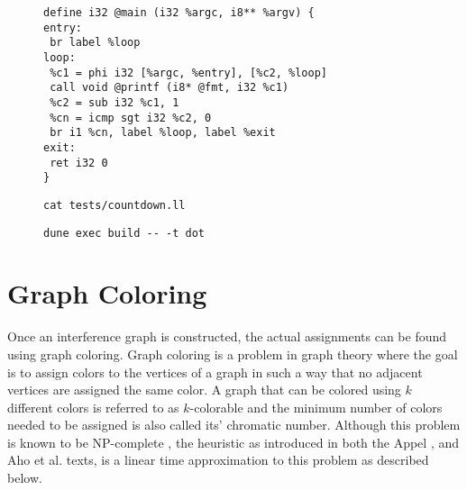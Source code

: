 \documentclass{article}
\begin{document}
\begin{figure}[H]
     \centering
     \begin{minipage}[b]{0.57\textwidth}
     \begin{verbatim}
define i32 @main (i32 %argc, i8** %argv) {
entry:
 br label %loop
loop:
 %c1 = phi i32 [%argc, %entry], [%c2, %loop]
 call void @printf (i8* @fmt, i32 %c1)
 %c2 = sub i32 %c1, 1
 %cn = icmp sgt i32 %c2, 0
 br i1 %cn, label %loop, label %exit
exit:
 ret i32 0
}
     \end{verbatim}
     \caption{\texttt{cat tests/countdown.ll}}\label{fig:countdown.ll}
   \end{minipage}
   \begin{minipage}[b]{0.42\textwidth}
     \centering
     
     \caption{\texttt{dune exec build -{}- -t dot}}\label{fig:countdown.dot}
   \end{minipage}
\end{figure}









\section{Graph Coloring}
Once an interference graph is constructed, the actual assignments can be found using graph coloring.
Graph coloring is a problem in graph theory where the goal is to assign colors to the vertices of a graph in such a way that no adjacent vertices are assigned the same color.
A graph that can be colored using \(k\) different colors is referred to as \(k\)-colorable and the minimum number of colors needed to be assigned is also called its' chromatic number.
Although this problem is known to be NP-complete  \cites[229]{tiger}[510]{dragon}, the heuristic as introduced in
both the Appel \cite[229]{tiger}, and Aho et al. \cites[557]{dragon} texts,
is a linear time approximation to this problem as described below.
\end{document}
